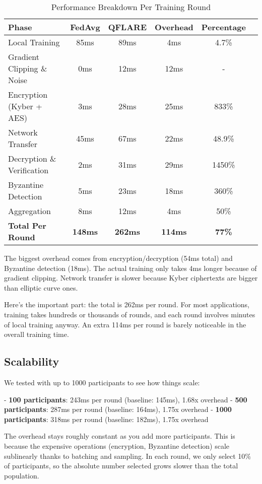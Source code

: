 \documentclass[journal,onecolumn]{IEEEtran}
\begin{document}
\begin{table}[h]
\centering
\caption{Performance Breakdown Per Training Round}
\label{tab:performance_breakdown}
\begin{tabular}{@{}lccccc@{}}
\toprule
\textbf{Phase} & \textbf{FedAvg} & \textbf{QFLARE} & \textbf{Overhead} & \textbf{Percentage} \\
\midrule
Local Training & 85ms & 89ms & 4ms & 4.7\% \\
Gradient Clipping \& Noise & 0ms & 12ms & 12ms & - \\
Encryption (Kyber + AES) & 3ms & 28ms & 25ms & 833\% \\
Network Transfer & 45ms & 67ms & 22ms & 48.9\% \\
Decryption \& Verification & 2ms & 31ms & 29ms & 1450\% \\
Byzantine Detection & 5ms & 23ms & 18ms & 360\% \\
Aggregation & 8ms & 12ms & 4ms & 50\% \\
\midrule
\textbf{Total Per Round} & \textbf{148ms} & \textbf{262ms} & \textbf{114ms} & \textbf{77\%} \\
\bottomrule
\end{tabular}
\end{table}

The biggest overhead comes from encryption/decryption (54ms total) and Byzantine detection (18ms). The actual training only takes 4ms longer because of gradient clipping. Network transfer is slower because Kyber ciphertexts are bigger than elliptic curve ones.

Here's the important part: the total is 262ms per round. For most applications, training takes hundreds or thousands of rounds, and each round involves minutes of local training anyway. An extra 114ms per round is barely noticeable in the overall training time.

\subsection{Scalability}

We tested with up to 1000 participants to see how things scale:

- \textbf{100 participants}: 243ms per round (baseline: 145ms), 1.68x overhead
- \textbf{500 participants}: 287ms per round (baseline: 164ms), 1.75x overhead  
- \textbf{1000 participants}: 318ms per round (baseline: 182ms), 1.75x overhead

The overhead stays roughly constant as you add more participants. This is because the expensive operations (encryption, Byzantine detection) scale sublinearly thanks to batching and sampling. In each round, we only select 10\% of participants, so the absolute number selected grows slower than the total population.
\end{document}
